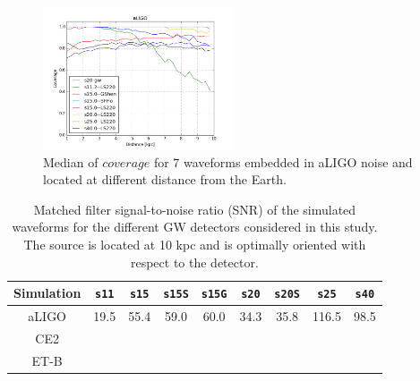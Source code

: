 \begin{figure}
  \centering
  \includegraphics[width=0.5\textwidth]{plots/covppb_all_aLIGO}
 \caption{Median of $coverage$ for 7 waveforms embedded in aLIGO noise and located at different distance from the Earth. } \label{fig:aLIGOall}
\end{figure}


\begin{table}
  \centering
  \begin{tabular}{c|cccccccc}
    \hline
    
    Simulation & \texttt{s11} & \texttt{s15} & \texttt{s15S} & \texttt{s15G} & \texttt{s20} & \texttt{s20S} & \texttt{s25}  & \texttt{s40}
    \\   
    \hline
    aLIGO      & 19.5         & 55.4         & 59.0          &   60.0        & 34.3         &   35.8          & 116.5         & 98.5
    \\ 
    \hline
    CE2
    \\
    \hline
    ET-B
    \\ 
  \end{tabular}
  \caption{%
    Matched filter signal-to-noise ratio (SNR) of the simulated waveforms for
    the different GW detectors considered in this study. The source is located
    at 10 kpc and is optimally oriented with respect to the detector.
  }
  \label{Tab:SNR}
\end{table}
